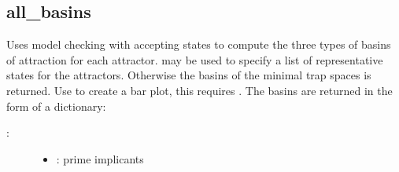 \documentclass[letterpaper,10pt,english]{sphinxmanual}
\begin{document}
\subsection{all\_basins}
\label{\detokenize{Basins:id4}}\label{\detokenize{Basins:all-basins}}

\begin{fulllineitems}
\label{\detokenize{Basins:PyBoolNet.Basins.all_basins}}
Uses model checking with accepting states to compute the three types of basins of attraction for each attractor.
 may be used to specify a list of representative states for the attractors.
Otherwise the basins of the minimal trap spaces is returned.
Use  to create a bar plot, this requires .
The basins are returned in the form of a dictionary:

\begin{sphinxVerbatim}[commandchars=\\\{\}]
     
     
              
                             
                              
     
     
\end{sphinxVerbatim}
\begin{description}
\item[{:}] \leavevmode\begin{itemize}
\item {} 
: prime implicants


\end{itemize}
\end{description}
\end{fulllineitems}
\end{document}
